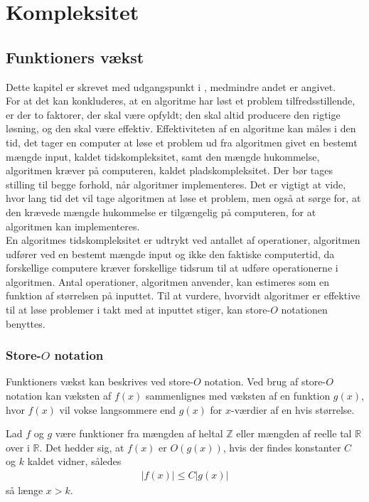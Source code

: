 \chapter{Kompleksitet}
\section{Funktioners vækst}
Dette kapitel er skrevet med udgangspunkt i \citep{dmat} , medmindre andet er angivet. \\

For at det kan konkluderes, at en algoritme har løst et problem tilfredsstillende, er der to faktorer, der skal være opfyldt; den skal altid producere den rigtige løsning, og den skal være effektiv. 
Effektiviteten af en algoritme kan måles i den tid, det tager en computer at løse et problem ud fra algoritmen givet en bestemt mængde input, kaldet tidskompleksitet, samt den mængde hukommelse, algoritmen kræver på computeren, kaldet pladskompleksitet. 
Der bør tages stilling til begge forhold, når algoritmer implementeres.
Det er vigtigt at vide, hvor lang tid det vil tage algoritmen at løse et problem, men også at sørge for, at den krævede mængde hukommelse er tilgængelig på computeren, for at algoritmen kan implementeres. \\ 
En algoritmes tidskompleksitet er udtrykt ved antallet af operationer, algoritmen udfører ved en bestemt mængde input og ikke den faktiske computertid, da forskellige computere kræver forskellige tidsrum til at udføre operationerne i algoritmen. 
Antal operationer, algoritmen anvender, kan estimeres som en funktion af størrelsen på inputtet. 
Til at vurdere, hvorvidt algoritmer er effektive til at løse problemer i takt med at inputtet stiger, kan store-$O$ notationen benyttes.

\subsection{Store-$O$ notation}
Funktioners vækst kan beskrives ved store-$O$ notation.
Ved brug af store-$O$ notation kan væksten af $f(x)$ sammenlignes med væksten af en funktion $g(x)$, hvor $f(x)$ vil vokse langsommere end $g(x)$ for $x$-værdier af en hvis størrelse. \\
\begin{defn}\label{eq_o}
	Lad $f$ og $g$ være funktioner fra mængden af heltal $\mathbb{Z}$ eller mængden af reelle tal $\mathbb{R}$ over i $\mathbb{R}$. 
	Det hedder sig, at $f(x)$ er $O(g(x))$, hvis der findes konstanter $C$ og $k$ kaldet vidner, således 
\begin{align*}
|f(x)| \leq C |g(x)|
\end{align*}
så længe $x>k$.
\end{defn}

